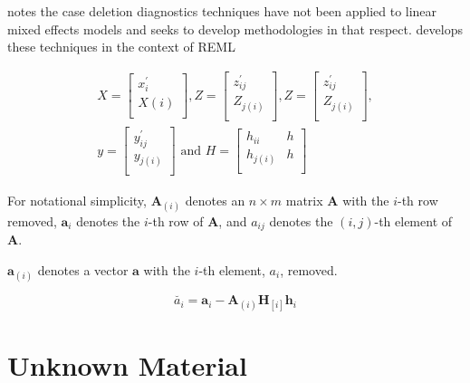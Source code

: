 \documentclass[12pt, a4paper]{report}
\theoremstyle{plain}
\theoremstyle{definition}
\theoremstyle{remark}
\begin{document}
	
	\citet{Christensen} notes the case deletion diagnostics techniques have not been applied to linear mixed effects models and seeks to develop methodologies in that respect. \citet{Christensen} develops these techniques in the context of REML
	
	
	\begin{eqnarray*}
		X= \left[%
		\begin{array}{c}
			x^\prime_{i} \\
			X(i) \\
		\end{array}%
		\right],
		Z= \left[%
		\begin{array}{c}
			z^\prime_{ij} \\
			Z_{j(i)} \\
		\end{array}%
		\right] ,
		Z = \left[%
		\begin{array}{c}
			z^\prime_{ij} \\
			Z_{j(i)} \\
		\end{array}%
		\right], \\
		y = \left[%
		\begin{array}{c}
			y^\prime_{ij} \\
			y_{j(i)} \\
		\end{array}%
		\right]
		\mbox{ and } H = \left[%
		\begin{array}{cc}
			h_{ii}& h\\
			h_{j(i)} & h\\
		\end{array}%
		\right]
	\end{eqnarray*}
	
	For notational simplicity, $\boldsymbol{A}_{(i)}$ denotes an $n
	\times m$ matrix  $\boldsymbol{A}$ with the $i$-th row removed,
	$\boldsymbol{a}_{i}$ denotes the $i$-th row of $\boldsymbol{A}$,
	and $a_{ij}$ denotes the $(i, j)$-th element of $\boldsymbol{A}$.
	
	$\boldsymbol{a}_{(i)}$ denotes a vector $\boldsymbol{a}$ with the $i$-th element, $a_{i}$, removed.
	
	\begin{equation}
	\breve{a_{i}} =  \boldsymbol{a}_{i} -
	\boldsymbol{A}_{(i)}\boldsymbol{H}_{[i]}\boldsymbol{h}_{i}
	\end{equation}
\section{Unknown Material}
\end{document}
